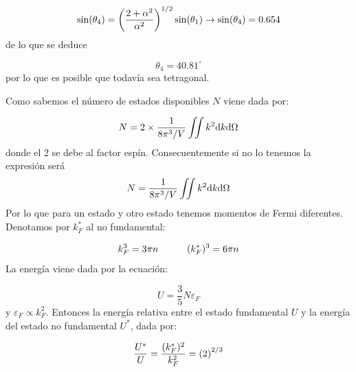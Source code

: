 \begin{solucion}
	\begin{equation*}
		\sin (\theta_4) =\left( \frac{2+\alpha^2}{\alpha^2} \right)^{1/2} \sin (\theta_1) \rightarrow \sin (\theta_4) = 0.654
	\end{equation*}
	de lo que se deduce 
	
	\begin{equation*}
		\theta_4 = 40.81^\circ
	\end{equation*}
	por lo que es posible que todavía sea tetragonal.
\end{solucion}

\begin{solucion}
	Como sabemos el número de estados disponibles $N$ viene dada por: 
	
	\begin{equation*}
		N = 2 \times \frac{1}{8\pi^3/ V} \iint k^2 \mathrm{d} k \mathrm{d} \Omega
	\end{equation*}
	donde el 2 se debe al factor espín. Consecuentemente si no lo tenemos la expresión será
	\begin{equation*}
		N = \frac{1}{8\pi^3/V} \iint k^2 \mathrm{d} k \mathrm{d} \Omega
	\end{equation*}
	Por lo que para un estado y otro estado tenemos momentos de Fermi diferentes. Denotamos por $k_F^*$ al no fundamental:
	
	\begin{equation*}
		k_F^3 = 3\pi n \quad \quad \quad (k_F^*)^3 = 6 \pi n
	\end{equation*}
	La energía viene dada por la ecuación:
	
	\begin{equation*}
		U = \frac{3}{5} N \varepsilon_F
	\end{equation*}
	y $\varepsilon_F\propto k_F^2$. Entonces la energía relativa entre el estado fundamental $U$ y la energía del estado no fundamental $U^*$, dada por:
	
	\begin{equation*}
		\frac{U^*}{U} = \frac{(k_F^*)^2}{k_F^2} = \left( 2 \right)^{2/3} 
	\end{equation*}
	
\end{solucion}	
